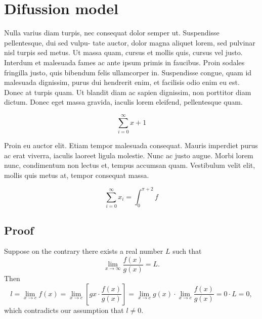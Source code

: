 \chapter{Difussion model}

Nulla varius diam turpis, nec consequat dolor semper ut. Suspendisse pellentesque, dui sed vulpu-
tate auctor, dolor magna aliquet lorem, sed pulvinar nisl turpis sed metus. Ut massa quam, cursus
et mollis quis, cursus vel justo. Interdum et malesuada fames ac ante ipsum primis in faucibus.
Proin sodales fringilla justo, quis bibendum felis ullamcorper in. Suspendisse congue, quam id
malesuada dignissim, purus dui hendrerit enim, et facilisis odio enim eu est. Donec at turpis quam.
Ut blandit diam ac sapien dignissim, non porttitor diam dictum. Donec eget massa gravida, iaculis
lorem eleifend, pellentesque quam.

\begin{displaymath}\sum_{i=0}^{\infty} x + 1\end{displaymath}

Proin eu auctor elit. Etiam tempor malesuada consequat. Mauris imperdiet purus ac erat
viverra, iaculis laoreet ligula molestie. Nunc ac justo augue. Morbi lorem nunc, condimentum non
lectus et, tempus accumsan quam. Vestibulum velit elit, mollis quis metus at, tempor consequat
massa.

\begin{equation}\sum_{i=0}^{\infty}x_i=\int_{0}^{\pi+2} f\end{equation}

\section{Proof}
Suppose on the contrary there exists a real number $L$ such that
\begin{displaymath}
\lim_{x\rightarrow\infty} \frac{f(x)}{g(x)} = L.
\end{displaymath}
Then
\begin{displaymath}
l=\lim_{x\rightarrow c} f(x)
= \lim_{x\rightarrow c}
\left[ g{x} \cdot \frac{f(x)}{g(x)} \right ]
= \lim_{x\rightarrow c} g(x) \cdot \lim_{x\rightarrow c}
\frac{f(x)}{g(x)} = 0\cdot L = 0,
\end{displaymath}
which contradicts our assumption that $l\neq 0$.

